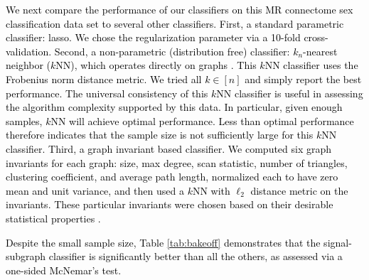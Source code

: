 \documentclass[10pt,journal,cspaper,compsoc]{IEEEtran}
\providecommand{\tk}[1]{\textcolor{black}{#1}}
\begin{document}
\tk{We next compare the performance of our classifiers on this MR connectome sex classification data set to several other classifiers. First, a standard parametric classifier: lasso.  We chose the regularization parameter via a 10-fold cross-validation.  Second, a non-parametric (distribution free) classifier: $k_n$-nearest neighbor ($k$NN), which operates directly on graphs \cite{VP11_super}.  This $k$NN classifier uses the Frobenius norm distance metric.  We tried all $k \in [n]$ and simply report the best performance. The universal consistency of this $k$NN classifier is useful in assessing the algorithm complexity supported by this data.  In particular, given enough samples, $k$NN will achieve optimal performance.  Less than optimal performance therefore indicates that the sample size is not sufficiently large for this $k$NN classifier.  Third, a graph invariant based classifier.  We computed six graph invariants for each graph: size, max degree, scan statistic, number of triangles, clustering coefficient, and average path length, normalized each to have zero mean and unit variance, and then used a $k$NN with $\ell_2$ distance metric on the invariants. These particular invariants were chosen based on their desirable statistical properties \cite{PCP10, priebe2010you, Rukhin2011}.} 

\tk{Despite the small sample size, Table \ref{tab:bakeoff} demonstrates that the signal-subgraph classifier is significantly better than all the others, as assessed via a one-sided McNemar's test.}  %
\end{document}
